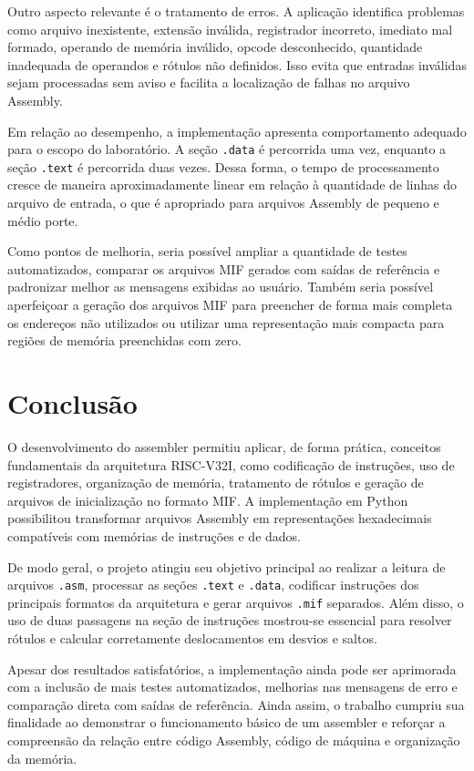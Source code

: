 \documentclass[conference]{IEEEtran}
\begin{document}
Outro aspecto relevante é o tratamento de erros. A aplicação identifica problemas como arquivo inexistente, extensão inválida, registrador incorreto, imediato mal formado, operando de memória inválido, opcode desconhecido, quantidade inadequada de operandos e rótulos não definidos. Isso evita que entradas inválidas sejam processadas sem aviso e facilita a localização de falhas no arquivo Assembly.

Em relação ao desempenho, a implementação apresenta comportamento adequado para o escopo do laboratório. A seção \texttt{.data} é percorrida uma vez, enquanto a seção \texttt{.text} é percorrida duas vezes. Dessa forma, o tempo de processamento cresce de maneira aproximadamente linear em relação à quantidade de linhas do arquivo de entrada, o que é apropriado para arquivos Assembly de pequeno e médio porte.

Como pontos de melhoria, seria possível ampliar a quantidade de testes automatizados, comparar os arquivos MIF gerados com saídas de referência e padronizar melhor as mensagens exibidas ao usuário. Também seria possível aperfeiçoar a geração dos arquivos MIF para preencher de forma mais completa os endereços não utilizados ou utilizar uma representação mais compacta para regiões de memória preenchidas com zero.


\section{Conclusão}

O desenvolvimento do assembler permitiu aplicar, de forma prática, conceitos fundamentais da arquitetura RISC-V32I, como codificação de instruções, uso de registradores, organização de memória, tratamento de rótulos e geração de arquivos de inicialização no formato MIF. A implementação em Python possibilitou transformar arquivos Assembly em representações hexadecimais compatíveis com memórias de instruções e de dados.

De modo geral, o projeto atingiu seu objetivo principal ao realizar a leitura de arquivos \texttt{.asm}, processar as seções \texttt{.text} e \texttt{.data}, codificar instruções dos principais formatos da arquitetura e gerar arquivos \texttt{.mif} separados. Além disso, o uso de duas passagens na seção de instruções mostrou-se essencial para resolver rótulos e calcular corretamente deslocamentos em desvios e saltos.

Apesar dos resultados satisfatórios, a implementação ainda pode ser aprimorada com a inclusão de mais testes automatizados, melhorias nas mensagens de erro e comparação direta com saídas de referência. Ainda assim, o trabalho cumpriu sua finalidade ao demonstrar o funcionamento básico de um assembler e reforçar a compreensão da relação entre código Assembly, código de máquina e organização da memória.
\end{document}

